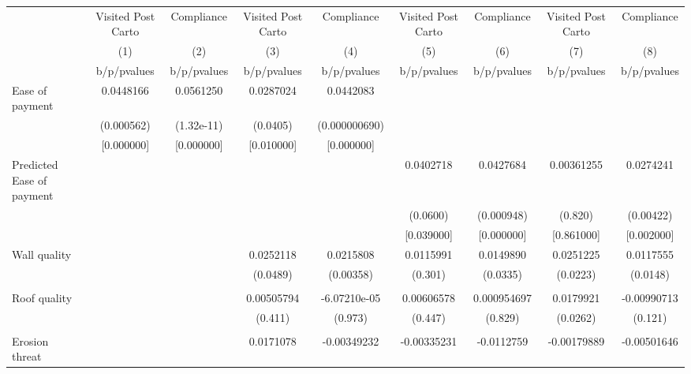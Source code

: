 {
\def\sym#1{\ifmmode^{#1}\else\(^{#1}\)\fi}
\begin{tabular}{l*{8}{c}}
\toprule
                &\multicolumn{1}{c}{Visited Post Carto}&\multicolumn{1}{c}{Compliance}&\multicolumn{1}{c}{Visited Post Carto}&\multicolumn{1}{c}{Compliance}&\multicolumn{1}{c}{Visited Post Carto}&\multicolumn{1}{c}{Compliance}&\multicolumn{1}{c}{Visited Post Carto}&\multicolumn{1}{c}{Compliance}\\
                &\multicolumn{1}{c}{(1)}&\multicolumn{1}{c}{(2)}&\multicolumn{1}{c}{(3)}&\multicolumn{1}{c}{(4)}&\multicolumn{1}{c}{(5)}&\multicolumn{1}{c}{(6)}&\multicolumn{1}{c}{(7)}&\multicolumn{1}{c}{(8)}\\
                &b/p/pvalues&b/p/pvalues&b/p/pvalues&b/p/pvalues&b/p/pvalues&b/p/pvalues&b/p/pvalues&b/p/pvalues\\
\midrule
Ease of payment &0.0448166&0.0561250&0.0287024&0.0442083&         &         &         &         \\
                &(0.000562)&(1.32e-11)& (0.0405)&(0.000000690)&         &         &         &         \\
                &[0.000000]&[0.000000]&[0.010000]&[0.000000]&         &         &         &         \\
Predicted Ease of payment&         &         &         &         &0.0402718&0.0427684&0.00361255&0.0274241\\
                &         &         &         &         & (0.0600)&(0.000948)&  (0.820)&(0.00422)\\
                &         &         &         &         &[0.039000]&[0.000000]&[0.861000]&[0.002000]\\
Wall quality    &         &         &0.0252118&0.0215808&0.0115991&0.0149890&0.0251225&0.0117555\\
                &         &         & (0.0489)&(0.00358)&  (0.301)& (0.0335)& (0.0223)& (0.0148)\\
                &         &         &         &         &         &         &         &         \\
Roof quality    &         &         &0.00505794&-6.07210e-05&0.00606578&0.000954697&0.0179921&-0.00990713\\
                &         &         &  (0.411)&  (0.973)&  (0.447)&  (0.829)& (0.0262)&  (0.121)\\
                &         &         &         &         &         &         &         &         \\
Erosion threat  &         &         &0.0171078&-0.00349232&-0.00335231&-0.0112759&-0.00179889&-0.00501646\\

\end{tabular}}
